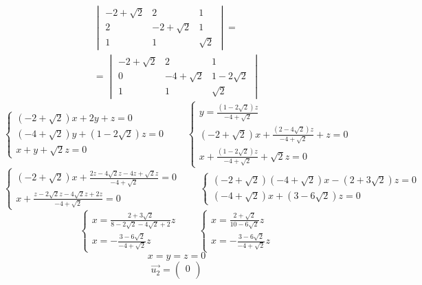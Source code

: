 \begin{itemize}
\begin{multline*}
\begin{vmatrix}
            -2 + \sqrt2 & 2 & 1 \\
            2 & -2 + \sqrt2 & 1 \\
            1 & 1 & \sqrt2
        \end{vmatrix} = \\
        =
        \begin{vmatrix}
            -2 + \sqrt2 & 2 & 1 \\
            0 & -4 + \sqrt2 & 1 - 2\sqrt2 \\
            1 & 1 & \sqrt2
        \end{vmatrix}
    \end{multline*}
    $$
    \begin{cases}
        (-2 + \sqrt2)x + 2y + z = 0 \\
        (-4 + \sqrt2)y + (1 - 2\sqrt2)z = 0 \\
        x + y + \sqrt2z = 0
    \end{cases} \qquad
    \begin{cases}
        y = \frac{(1 - 2\sqrt2)z}{-4 + \sqrt2} \\
        (-2 + \sqrt2)x + \frac{(2 - 4\sqrt2)z}{-4 + \sqrt2} + z = 0 \\
        x + \frac{(1 - 2\sqrt2)z}{-4 + \sqrt2} + \sqrt2z = 0
    \end{cases} $$
    $$
    \begin{cases}
        (-2 + \sqrt2)x + \frac{2z - 4\sqrt2z -4z + \sqrt2z}{-4 + \sqrt2} = 0 \\
        x + \frac{z - 2\sqrt2z - 4\sqrt2z + 2z}{-4 + \sqrt2} = 0
    \end{cases} \qquad
    \begin{cases}
    	(-2 + \sqrt2)(-4 + \sqrt2)x -(2 + 3\sqrt2)z = 0 \\
        (-4 + \sqrt2)x + (3 - 6\sqrt2)z = 0
    \end{cases} $$
    $$
    \begin{cases}
        x = \frac{2 + 3\sqrt2}{8 - 2\sqrt2 - 4\sqrt2 + 2}z \\
        x = -\frac{3 - 6\sqrt2}{-4 + \sqrt2}z
    \end{cases} \qquad
    \begin{cases}
        x = \frac{2 + \sqrt2}{10 - 6\sqrt2}z \\
        x = -\frac{3 - 6\sqrt2}{-4 + \sqrt2}z
    \end{cases} $$
    $$ x = y = z = 0 $$
    $$ \vec{u_2} =
    \begin{pmatrix}
    	0 \\

\end{pmatrix}$$
\end{itemize}
